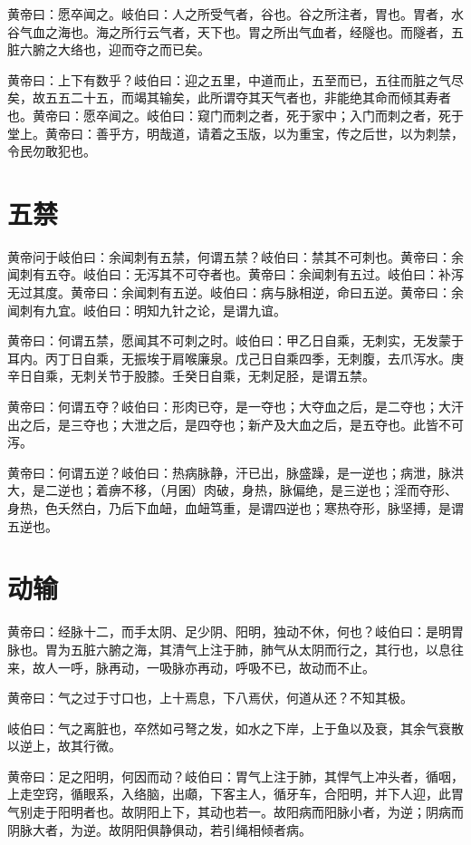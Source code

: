 \documentclass[a4paper,12pt,UTF8,twoside]{ctexbook}
\begin{document}
	黄帝曰：愿卒闻之。岐伯曰：人之所受气者，谷也。谷之所注者，胃也。胃者，水谷气血之海也。海之所行云气者，天下也。胃之所出气血者，经隧也。而隧者，五脏六腑之大络也，迎而夺之而已矣。
	
	黄帝曰：上下有数乎？岐伯曰：迎之五里，中道而止，五至而已，五往而脏之气尽矣，故五五二十五，而竭其输矣，此所谓夺其天气者也，非能绝其命而倾其寿者也。黄帝曰：愿卒闻之。岐伯曰：窥门而刺之者，死于家中；入门而刺之者，死于堂上。黄帝曰：善乎方，明哉道，请着之玉版，以为重宝，传之后世，以为刺禁，令民勿敢犯也。
	\chapter{五禁}
	
	黄帝问于岐伯曰：余闻刺有五禁，何谓五禁？岐伯曰：禁其不可刺也。黄帝曰：余闻刺有五夺。岐伯曰：无泻其不可夺者也。黄帝曰：余闻刺有五过。岐伯曰：补泻无过其度。黄帝曰：余闻刺有五逆。岐伯曰：病与脉相逆，命曰五逆。黄帝曰：余闻刺有九宜。岐伯曰：明知九针之论，是谓九谊。
	
	黄帝曰：何谓五禁，愿闻其不可刺之时。岐伯曰：甲乙日自乘，无刺实，无发蒙于耳内。丙丁日自乘，无振埃于肩喉廉泉。戊己日自乘四季，无刺腹，去爪泻水。庚辛日自乘，无刺关节于股膝。壬癸日自乘，无刺足胫，是谓五禁。
	
	黄帝曰：何谓五夺？岐伯曰：形肉已夺，是一夺也；大夺血之后，是二夺也；大汗出之后，是三夺也；大泄之后，是四夺也；新产及大血之后，是五夺也。此皆不可泻。
	
	黄帝曰：何谓五逆？岐伯曰：热病脉静，汗已出，脉盛躁，是一逆也；病泄，脉洪大，是二逆也；着痹不移，（月囷）肉破，身热，脉偏绝，是三逆也；淫而夺形、身热，色夭然白，乃后下血衄，血衄笃重，是谓四逆也；寒热夺形，脉坚搏，是谓五逆也。
	\chapter{动输}
	
	黄帝曰：经脉十二，而手太阴、足少阴、阳明，独动不休，何也？岐伯曰：是明胃脉也。胃为五脏六腑之海，其清气上注于肺，肺气从太阴而行之，其行也，以息往来，故人一呼，脉再动，一吸脉亦再动，呼吸不已，故动而不止。
	
	黄帝曰：气之过于寸口也，上十焉息，下八焉伏，何道从还？不知其极。
	
	岐伯曰：气之离脏也，卒然如弓弩之发，如水之下岸，上于鱼以及衰，其余气衰散以逆上，故其行微。
	
	黄帝曰：足之阳明，何因而动？岐伯曰：胃气上注于肺，其悍气上冲头者，循咽，上走空窍，循眼系，入络脑，出顑，下客主人，循牙车，合阳明，并下人迎，此胃气别走于阳明者也。故阴阳上下，其动也若一。故阳病而阳脉小者，为逆；阴病而阴脉大者，为逆。故阴阳俱静俱动，若引绳相倾者病。
	
\end{document}
